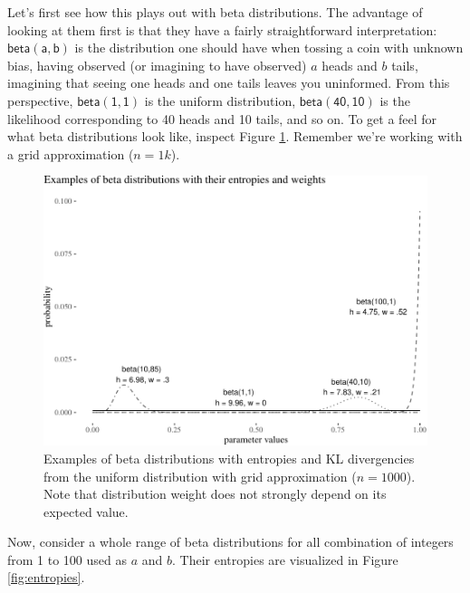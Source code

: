 \documentclass[
  10pt,
  dvipsnames,enabledeprecatedfontcommands]{scrartcl}
\begin{document}
Let's first see how this plays out with beta distributions. The
advantage of looking at them first is that they have a fairly
straightforward interpretation: \(\mathsf{beta(a,b)}\) is the
distribution one should have when tossing a coin with unknown bias,
having observed (or imagining to have observed) \(a\) heads and \(b\)
tails, imagining that seeing one heads and one tails leaves you
uninformed. From this perspective, \(\mathsf{beta(1,1)}\) is the uniform
distribution, \(\mathsf{beta(40,10)}\) is the likelihood corresponding
to 40 heads and 10 tails, and so on. To get a feel for what beta
distributions look like, inspect Figure \ref{fig:betas}. Remember we're
working with a grid approximation (\(n=1k\)).

\begin{figure}[H]


\begin{center}\includegraphics[width=1\linewidth]{impreciseEpistemicFINAL_files/figure-latex/fig:betas3-1} \end{center}
\caption{Examples of beta distributions with entropies and KL divergencies from the uniform distribution with grid approximation ($n=1000$). Note that distribution weight does not strongly depend on its expected value.}
\label{fig:betas}
\end{figure}

Now, consider a whole range of beta distributions for all combination of
integers from 1 to 100 used as \(a\) and \(b\). Their entropies are
visualized in Figure \ref{fig:entropies}.
\end{document}
